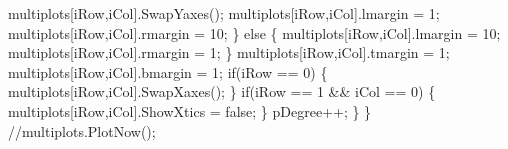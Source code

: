 {\btab \btab multiplots[iRow,iCol].SwapYaxes();\newline 
\btab \btab multiplots[iRow,iCol].lmargin = 1;\newline 
\btab \btab multiplots[iRow,iCol].rmargin = 10;\newline 
\btab \} else \{\newline 
\btab \btab multiplots[iRow,iCol].lmargin = 10;\newline 
\btab \btab multiplots[iRow,iCol].rmargin = 1;\newline 
\btab \}\newline 
\btab multiplots[iRow,iCol].tmargin = 1;\newline 
\btab multiplots[iRow,iCol].bmargin = 1;\newline 
\btab if(iRow == 0) \{\newline 
\btab \btab multiplots[iRow,iCol].SwapXaxes();\newline 
\btab \}\newline 
\btab if(iRow == 1 && iCol == 0) \{  \newline 
\btab \btab multiplots[iRow,iCol].ShowXtics = false;\newline 
\btab \}\newline 
\btab pDegree++;\newline 
\}                        \newline 
\}\newline 
//multiplots.PlotNow();
 }
\BoSSSexe
{}
\BoSSSexe
{}
\BoSSSexe
